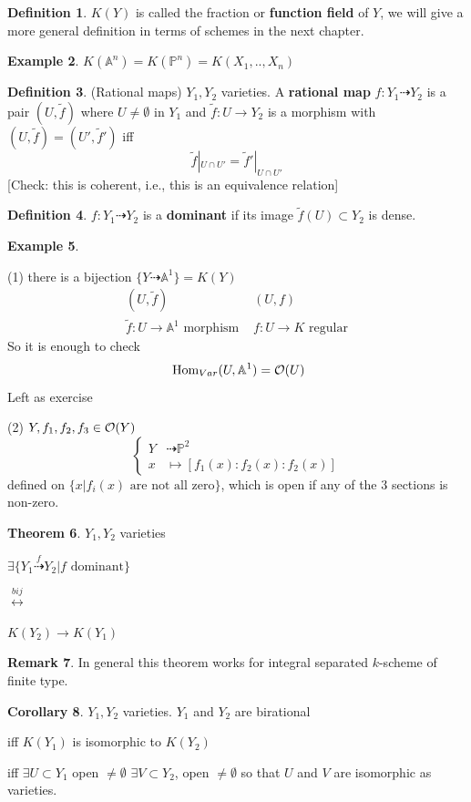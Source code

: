 \documentclass[11pt]{article}
\theoremstyle{definition}
\newtheorem{thm}{Theorem}[section]
\newtheorem{cor}[thm]{Corollary}
\newtheorem{dfn}[thm]{Definition}
\newtheorem{rmk}[thm]{Remark}
\newtheorem{ex}[thm]{Example}
\renewcommand{\hom}{\text{ Hom}}
\newcommand{\affn}{\mathbb A}
\newcommand{\proj}{\mathbb P}
\newcommand{\calo}{{\cal O}}
\newcommand{\lrta}{\longrightarrow}
\newcommand{\llrta}{\longleftrightarrow}
\begin{document}
\begin{dfn}
$K(Y)$ is called the fraction or \textbf{function field} of $Y$, we will give a more general definition in terms of schemes in the next chapter.
\end{dfn}

\begin{ex}
$K(\affn^n)=K(\proj^n)=K(X_1,..,X_n)$
\end{ex}

\begin{dfn}
(Rational maps) $Y_1,Y_2$ varieties. A \textbf{rational map} $f: Y_1\dashrightarrow Y_2$ is a pair $(U,\tilde{f})$ where $U\neq \emptyset$ in $Y_1$ and $\tilde{f}:U\lrta Y_2$ is a morphism with $(U,\tilde{f})=(U',\tilde{f}')$ iff 
$$
\tilde{f}|_{U\cap U'}=\tilde{f}'|_{U\cap U'}
$$
[Check: this is coherent, i.e., this is an equivalence relation]
\end{dfn}

\begin{dfn}
$f:Y_1\dashrightarrow Y_2$ is a \textbf{dominant} if its image $\tilde{f}(U)\subset Y_2$ is dense.
\end{dfn}

\begin{ex}\ 

(1) there is a bijection $\{Y\dashrightarrow \affn^1\}=K(Y)$
$$
\begin{matrix}
(U,\tilde{f}) & (U,f)\\
\tilde{f}:U\lrta \affn^1\text{ morphism } & f: U\lrta K\text{ regular}
\end{matrix}
$$
So it is enough to check 
$$
\hom_{Var}(U,\affn^1)=\calo(U)
$$
Left as exercise

(2) $Y,f_1,f_2,f_3\in\calo(Y)$
$$
\left\{\begin{aligned}
Y&\dashrightarrow \proj^2\\
x&\longmapsto [f_1(x):f_2(x):f_2(x)]
\end{aligned}\right.
$$
defined on $\{x|f_i (x) \text{ are not all zero}\}$, which is open if any of the $3$ sections is non-zero.
\end{ex}
\begin{thm}\label{chap1thm:dominant_rational_map_bij_morphism_of_function_fields}
$Y_1,Y_2$ varieties

$\exists \{Y_1\overset{f}{\dashrightarrow} Y_2|f \text{ dominant}\}$

$\overset{bij}{\llrta}$

$K(Y_2)\lrta K(Y_1)$
\end{thm}
\begin{rmk}
In general this theorem works for integral separated $k$-scheme of finite type.
\end{rmk}
\begin{cor}
$Y_1, Y_2$ varieties. $Y_1$ and $Y_2$ are birational 

iff $K(Y_1)$ is isomorphic to $K(Y_2)$

iff $\exists U\subset Y_1$ open $\neq \emptyset$
$\exists V\subset Y_2$, open $\neq \emptyset$ so that $U$ and $V$ are isomorphic as varieties.
\end{cor}
\end{document}
